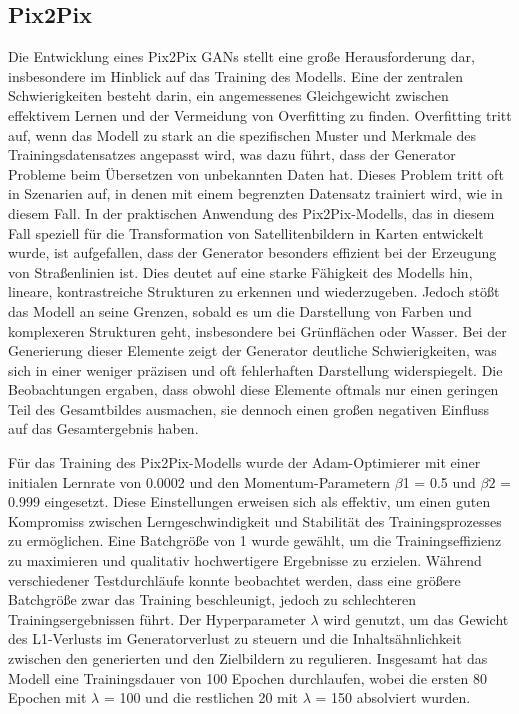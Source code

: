 \subsection{Pix2Pix}
Die Entwicklung eines Pix2Pix GANs stellt eine große Herausforderung dar, insbesondere im Hinblick auf das Training des Modells. Eine der zentralen Schwierigkeiten besteht darin, ein angemessenes Gleichgewicht zwischen effektivem Lernen und der Vermeidung von Overfitting zu finden. Overfitting tritt auf, wenn das Modell zu stark an die spezifischen Muster und Merkmale des Trainingsdatensatzes angepasst wird, was dazu führt, dass der Generator Probleme beim Übersetzen von unbekannten Daten hat. Dieses Problem tritt oft in Szenarien auf, in denen mit einem begrenzten Datensatz trainiert wird, wie in diesem Fall.\newline
In der praktischen Anwendung des Pix2Pix-Modells, das in diesem Fall speziell für die Transformation von Satellitenbildern in Karten entwickelt wurde, ist aufgefallen, dass der Generator besonders effizient bei der Erzeugung von Straßenlinien ist. Dies deutet auf eine starke Fähigkeit des Modells hin, lineare, kontrastreiche Strukturen zu erkennen und wiederzugeben.
Jedoch stößt das Modell an seine Grenzen, sobald es um die Darstellung von Farben und komplexeren Strukturen geht, insbesondere bei Grünflächen oder Wasser. Bei der Generierung dieser Elemente zeigt der Generator deutliche Schwierigkeiten, was sich in einer weniger präzisen und oft fehlerhaften Darstellung widerspiegelt. Die Beobachtungen ergaben, dass obwohl diese Elemente oftmals nur einen geringen Teil des Gesamtbildes ausmachen, sie dennoch einen großen negativen Einfluss auf das Gesamtergebnis haben.

Für das Training des Pix2Pix-Modells wurde der Adam-Optimierer mit einer initialen Lernrate von 0.0002 und den Momentum-Parametern $\beta$1 = 0.5 und $\beta2$ = 0.999 eingesetzt. Diese Einstellungen erweisen sich als effektiv, um einen guten Kompromiss zwischen Lerngeschwindigkeit und Stabilität des Trainingsprozesses zu ermöglichen. Eine Batchgröße von 1 wurde gewählt, um die Trainingseffizienz zu maximieren und qualitativ hochwertigere Ergebnisse zu erzielen. Während verschiedener Testdurchläufe konnte beobachtet werden, dass eine größere Batchgröße zwar das Training beschleunigt, jedoch zu schlechteren Trainingsergebnissen führt. Der Hyperparameter $\lambda$ wird genutzt, um das Gewicht des L1-Verlusts im Generatorverlust zu steuern und die Inhaltsähnlichkeit zwischen den generierten und den Zielbildern zu regulieren. Insgesamt hat das Modell eine Trainingsdauer von 100 Epochen durchlaufen, wobei die ersten 80 Epochen mit $\lambda$ = 100 und die restlichen 20 mit $\lambda$ = 150 absolviert wurden.

